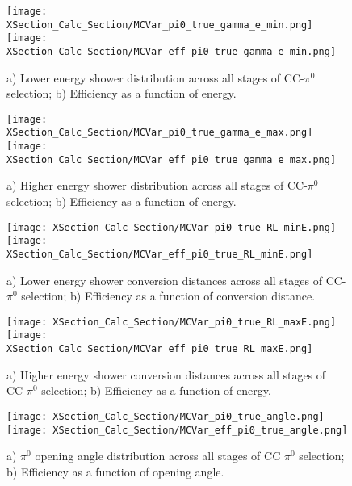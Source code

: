 \begin{figure}[h!]
\centering
\texttt{[image: XSection\_Calc\_Section/MCVar\_pi0\_true\_gamma\_e\_min.png]}
\hspace{1 mm}
\texttt{[image: XSection\_Calc\_Section/MCVar\_eff\_pi0\_true\_gamma\_e\_min.png]}
\caption{a) Lower energy shower distribution across all stages of CC-$\pi^0$ selection; b) Efficiency as a function of energy. }
\label{fig:pi0_effs_2}
\end{figure}

\begin{figure}[h!]
\centering
\texttt{[image: XSection\_Calc\_Section/MCVar\_pi0\_true\_gamma\_e\_max.png]}
\hspace{1 mm}
\texttt{[image: XSection\_Calc\_Section/MCVar\_eff\_pi0\_true\_gamma\_e\_max.png]}
\caption{a) Higher energy shower distribution across all stages of CC-$\pi^0$ selection; b) Efficiency as a function of energy. }
\label{fig:pi0_effs_3}
\end{figure}

\begin{figure}[h!]
\centering
\texttt{[image: XSection\_Calc\_Section/MCVar\_pi0\_true\_RL\_minE.png]}
\hspace{1 mm}
\texttt{[image: XSection\_Calc\_Section/MCVar\_eff\_pi0\_true\_RL\_minE.png]}
\caption{a) Lower energy shower conversion distances across all stages of CC-$\pi^0$ selection; b) Efficiency as a function of conversion distance. }
\label{fig:pi0_effs_4}
\end{figure}

\begin{figure}[h!]
\centering
\texttt{[image: XSection\_Calc\_Section/MCVar\_pi0\_true\_RL\_maxE.png]}
\hspace{1 mm}
\texttt{[image: XSection\_Calc\_Section/MCVar\_eff\_pi0\_true\_RL\_maxE.png]}
\caption{a) Higher energy shower conversion distances across all stages of CC-$\pi^0$ selection; b) Efficiency as a function of energy. }
\label{fig:pi0_effs_5}
\end{figure}


\begin{figure}[h!]
\texttt{[image: XSection\_Calc\_Section/MCVar\_pi0\_true\_angle.png]}
\hspace{3 mm}
\texttt{[image: XSection\_Calc\_Section/MCVar\_eff\_pi0\_true\_angle.png]}
\caption{a) $\pi^0$ opening angle distribution across all stages of CC $\pi^0$ selection; b) Efficiency as a function of opening angle. }
\label{fig:pi0_effs_6}
\end{figure}



